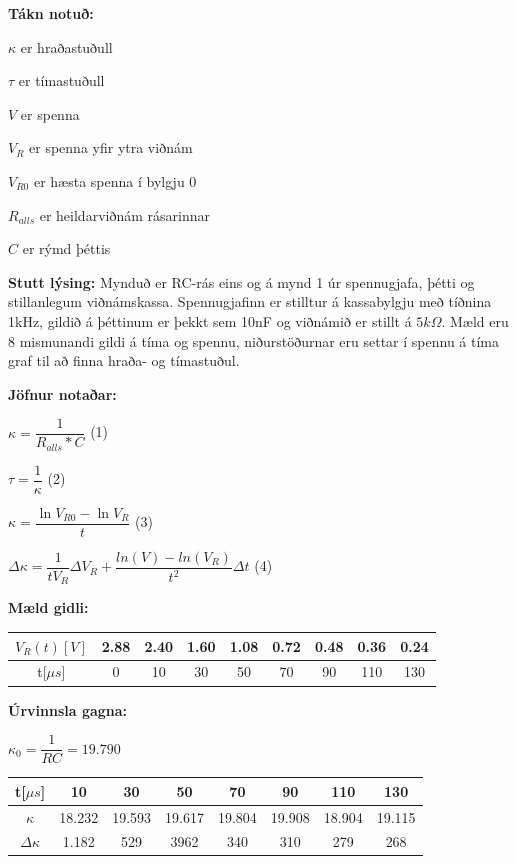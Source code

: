 \documentclass[12pt]{article}
\begin{document}
\bigskip

\textbf{Tákn notuð:}


$ \kappa $ er hraðastuðull


$ \tau $ er tímastuðull 


$ V $ er spenna 


$ V_R $ er spenna yfir ytra viðnám 


$ V_{R0}$ er hæsta spenna í bylgju 0 


$ R_{alls}$ er heildarviðnám rásarinnar 


$ C $ er rýmd þéttis 


\bigskip

\textbf{Stutt lýsing:}
Mynduð er RC-rás eins og á mynd 1 úr spennugjafa, þétti og stillanlegum viðnámskassa. Spennugjafinn er stilltur á kassabylgju með tíðnina 1kHz,
 gildið á þéttinum er þekkt sem 10nF og viðnámið er stillt á $ 5k \Omega$. Mæld eru 8 mismunandi gildi á tíma og spennu, niðurstöðurnar eru settar
  í spennu á tíma graf til að finna hraða- og tímastuðul.


\textbf{Jöfnur notaðar:}

\bigskip
$ \kappa = \dfrac{1}{R_{alls} *C}$ (1)
\bigskip


$ \tau = \dfrac{1}{\kappa}  $ (2)
\bigskip

$ \kappa = \dfrac{\ln{V_{R0}}-\ln{V_R}}{t}$ (3)
\bigskip


$ \Delta \kappa =  \dfrac{1}{tV_R}\Delta V_R + \dfrac{ln(V)-ln(V_R)} {t^2} \Delta t $ (4)

\bigskip



\textbf{Mæld gidli:}


\begin{table}[H]
    \begin{tabular}{|c|c|c|c|c|c|c|c|c|}
    \hline
    $V_R(t) [V]$  & 2.88 & 2.40 & 1.60 & 1.08 & 0.72 & 0.48 & 0.36 & 0.24  \\
    \hline
    t[$\mu s$] & 0 & 10 & 30 & 50 & 70 & 90 & 110 & 130  \\
    \hline
    \end{tabular}
\end{table}
 
\textbf{Úrvinnsla gagna:}

$ \kappa_0 = \dfrac{1}{RC} = 19.790$

\begin{table}[H]
    \begin{tabular}{|c|c|c|c|c|c|c|c|}
		t[$\mu s$] &10 & 30 & 50 & 70 & 90 & 110 & 130  \\
		\hline
		$ \kappa$ & 18.232 & 19.593 & 19.617 & 19.804 & 19.908 & 18.904 & 19.115 \\
		\hline
		$ \Delta \kappa$ & 1.182 & 529 & 3962 & 340 & 310 & 279 & 268\\
    \end{tabular}
\end{table}
\end{document}
